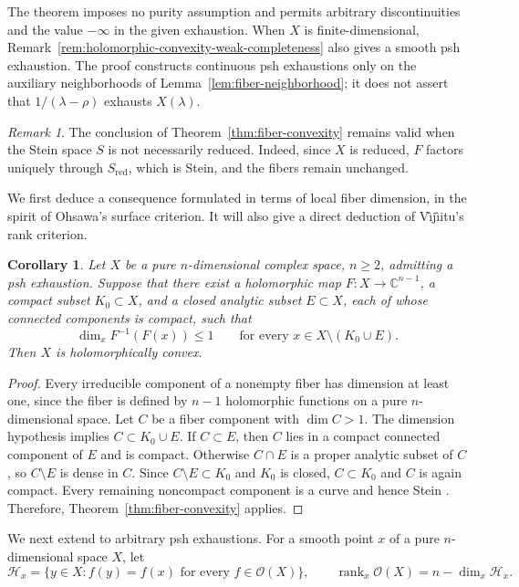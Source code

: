 \documentclass[11pt]{amsart}
\newtheorem{corollary}[theorem]{Corollary}
\theoremstyle{definition}
\theoremstyle{remark}
\newtheorem{remark}{Remark}[section]
\numberwithin{equation}{section}
\newcommand{\C}{\mathbb C}
\newcommand{\OO}{\mathcal O}
\begin{document}
The theorem imposes no purity assumption and permits arbitrary
discontinuities and the value $-\infty$ in the given exhaustion.
When $X$ is finite-dimensional,
Remark~\ref{rem:holomorphic-convexity-weak-completeness} also
gives a smooth psh exhaustion.
The proof constructs continuous psh exhaustions only on the
auxiliary neighborhoods of Lemma~\ref{lem:fiber-neighborhood};
it does not assert that $1/(\lambda-\rho)$ exhausts
$X(\lambda)$.

\begin{remark}
The conclusion of Theorem~\ref{thm:fiber-convexity} remains valid when the Stein space $S$ is not necessarily reduced. Indeed, since $X$ is reduced, $F$ factors uniquely through $S_{\mathrm{red}}$, which is Stein, and the fibers remain unchanged.
\end{remark}

We first deduce a consequence formulated in terms of local fiber
dimension, in the spirit of Ohsawa's surface criterion. It will
also give a direct deduction of V\^{\i}j\^{\i}itu's rank criterion.

\begin{corollary}\label{cor:curve-fiber-convexity}
Let $X$ be a pure $n$-dimensional complex space, $n\ge2$, admitting
a psh exhaustion. Suppose that there exist a holomorphic
map $F:X\to\C^{n-1}$, a compact subset $K_0\subset X$, and a closed
analytic subset $E\subset X$, each of whose connected components
is compact, such that
\[
 \dim_x F^{-1}(F(x))\le1
 \qquad\text{for every }x\in X\setminus(K_0\cup E).
\]
Then $X$ is holomorphically convex.
\end{corollary}

\begin{proof}
Every irreducible component of a nonempty fiber has dimension at
least one, since the fiber is defined by $n-1$ holomorphic functions
on a pure $n$-dimensional space. Let $C$ be a fiber component with
$\dim C>1$. The dimension hypothesis implies $C\subset K_0\cup E$.
If $C\subset E$, then $C$ lies in a compact connected component of
$E$ and is compact. Otherwise $C\cap E$ is a proper analytic subset
of $C$, so $C\setminus E$ is dense in $C$. Since
$C\setminus E\subset K_0$ and $K_0$ is closed, $C\subset K_0$ and
$C$ is again compact. Every remaining noncompact component is a
curve and hence Stein \cite[p.~327]{Narasimhan1962}.
Therefore, Theorem~\ref{thm:fiber-convexity} applies.
\end{proof}

We next extend \cite[Theorem~1.1]{VijituForum2022}
to arbitrary psh exhaustions.
For a smooth point $x$ of a pure $n$-dimensional space $X$, let
\[
 \mathcal H_x
 =\{y\in X:f(y)=f(x)\text{ for every }f\in\OO(X)\},
 \qquad
 \operatorname{rank}_x\OO(X)=n-\dim_x\mathcal H_x.
\]
\end{document}
